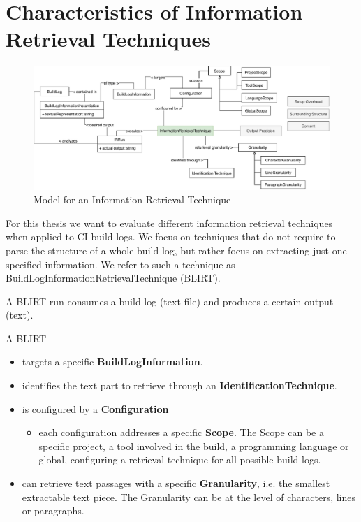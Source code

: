 \documentclass[\myrootdir/main.tex]{subfiles}
\begin{document}
\section{Characteristics of Information Retrieval Techniques}
\begin{figure}[h]
	\centering
	\includegraphics[width=\textwidth, clip]{img/ir-technique.pdf}
	\caption{Model for an Information Retrieval Technique}
	\label{fig:model-ie-technique}
\end{figure}
For this thesis we want to evaluate different information retrieval techniques when applied to CI build logs.
We focus on techniques that do not require to parse the structure of a whole build log, but rather focus on extracting just one specified information.
We refer to such a technique as BuildLogInformationRetrievalTechnique (BLIRT).

A BLIRT run consumes a build log (text file) and produces a certain output (text).

A BLIRT
\begin{itemize}
	\item targets a specific \textbf{BuildLogInformation}.
	\item identifies the text part to retrieve through an \textbf{IdentificationTechnique}.
	\item is configured by a \textbf{Configuration}
	      \begin{itemize}
		      \item each configuration addresses a specific \textbf{Scope}.
		            The Scope can be a specific project, a tool involved in the build, a programming language or global, configuring a retrieval technique for all possible build logs.
	      \end{itemize}
	\item can retrieve text passages with a specific \textbf{Granularity}, i.e. the smallest extractable text piece.
	      The Granularity can be at the level of characters, lines or paragraphs.
\end{itemize}
\end{document}
